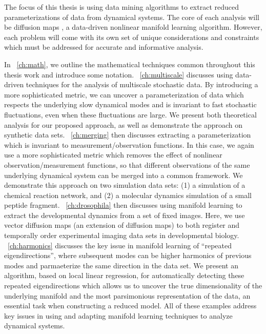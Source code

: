 The focus of this thesis is using data mining algorithms to extract reduced parameterizations of data from dynamical systems.
%
The core of each analysis will be diffusion maps \citep{Coifman2006}, a data-driven nonlinear manifold learning algorithm. 
%
However, each problem will come with its own set of unique considerations and constraints which must be addressed for accurate and informative analysis. 

In \chap~\ref{ch:math}, we outline the mathematical techniques common throughout this thesis work and introduce some notation. 
%
\chap~\ref{ch:multiscale} discusses using data-driven techniques for the analysis of multiscale stochastic data. 
%
By introducing a more sophisticated metric, we can uncover a parameterization of data which respects the underlying slow dynamical modes and is invariant to fast stochastic fluctuations, even when these fluctuations are large. 
%
We present both theoretical analysis for our proposed approach, as well as demonstrate the approach on synthetic data sets. 
%
\chap~\ref{ch:merging} then discusses extracting a parameterization which is invariant to measurement/observation functions. 
%
In this case, we again use a more sophisticated metric which removes the effect of nonlinear observation/measurement functions, so that different observations of the same underlying dynamical system can be merged into a common framework. 
%
We demonstrate this approach on two simulation data sets: (1) a simulation of a chemical reaction network, and (2) a molecular dynamics simulation of a small peptide fragment.
%
\chap~\ref{ch:drosophila} then discusses using manifold learning to extract the developmental dynamics from a set of fixed images. 
%
Here, we use vector diffusion maps (an extension of diffusion maps) to both register and temporally order experimental imaging data sets in developmental biology. 
%
\chap~\ref{ch:harmonics} discusses the key issue in manifold learning of ``repeated eigendirections'', where subsequent modes can be higher harmonics of previous modes and parmaeterize the same direction in the data set. 
%
We present an algorithm, based on local linear regression, for automatically detecting these repeated eigendirections which allows us to uncover the true dimensionality of the underlying manifold and the most parsimonious representation of the data, an essential task when constructing a reduced model.
%
All of these examples address key issues in using and adapting manifold learning techniques to analyze dynamical systems.
